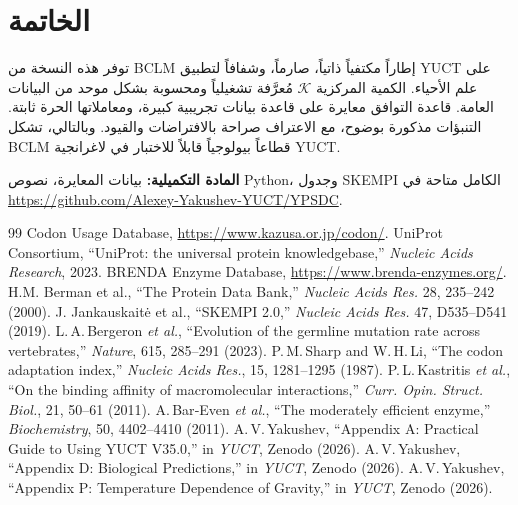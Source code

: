 \documentclass[11pt,a4paper]{article}
\newcommand{\REL}{\mathcal{K}}
\begin{document}
	\section{الخاتمة}
	توفر هذه النسخة من BCLM إطاراً مكتفياً ذاتياً، صارماً، وشفافاً لتطبيق YUCT على علم الأحياء. الكمية المركزية \(\REL\) مُعرَّفة تشغيلياً ومحسوبة بشكل موحد من البيانات العامة. قاعدة التوافق معايرة على قاعدة بيانات تجريبية كبيرة، ومعاملاتها الحرة ثابتة. التنبؤات مذكورة بوضوح، مع الاعتراف صراحة بالافتراضات والقيود. وبالتالي، تشكل BCLM قطاعاً بيولوجياً قابلاً للاختبار في لاغرانجية YUCT.
	
	\vspace{0.5cm}
	\noindent\textbf{المادة التكميلية:} بيانات المعايرة، نصوص Python، وجدول SKEMPI الكامل متاحة في \url{https://github.com/Alexey-Yakushev-YUCT/YPSDC}.
	
	\begin{thebibliography}{99}
		 Codon Usage Database, \url{https://www.kazusa.or.jp/codon/}.
		 UniProt Consortium, ``UniProt: the universal protein knowledgebase,'' \emph{Nucleic Acids Research}, 2023.
		 BRENDA Enzyme Database, \url{https://www.brenda-enzymes.org/}.
		 H.M. Berman et al., ``The Protein Data Bank,'' \emph{Nucleic Acids Res.} 28, 235–242 (2000).
		 J. Jankauskaitė et al., ``SKEMPI 2.0,'' \emph{Nucleic Acids Res.} 47, D535–D541 (2019).
		 L.\,A.\,Bergeron \emph{et al.}, ``Evolution of the germline mutation rate across vertebrates,'' \emph{Nature}, 615, 285–291 (2023).
		 P.\,M.\,Sharp and W.\,H.\,Li, ``The codon adaptation index,'' \emph{Nucleic Acids Res.}, 15, 1281–1295 (1987).
		 P.\,L.\,Kastritis \emph{et al.}, ``On the binding affinity of macromolecular interactions,'' \emph{Curr. Opin. Struct. Biol.}, 21, 50–61 (2011).
		 A.\,Bar‑Even \emph{et al.}, ``The moderately efficient enzyme,'' \emph{Biochemistry}, 50, 4402–4410 (2011).
		 A.\,V.\,Yakushev, ``Appendix A: Practical Guide to Using YUCT V35.0,'' in \emph{YUCT}, Zenodo (2026).
		 A.\,V.\,Yakushev, ``Appendix D: Biological Predictions,'' in \emph{YUCT}, Zenodo (2026).
		 A.\,V.\,Yakushev, ``Appendix P: Temperature Dependence of Gravity,'' in \emph{YUCT}, Zenodo (2026).
	\end{thebibliography}
	
\end{document}
